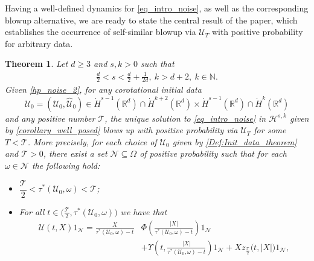 \documentclass[12pt,reqno]{amsart}
\theoremstyle{plain}
\newtheorem{theorem}{Theorem}[section]
\theoremstyle{remark}
\theoremstyle{plain}
\theoremstyle{definition}
\numberwithin{equation}{section}
\numberwithin{equation}{section}
\def\N{{\mathbb N}}
\newcommand{\norm}[1]{\left\|#1\right\|}
\newcommand{\HH}{\mathcal{H}}
\newcommand{\eps}{\varepsilon}
\begin{document}
	Having a well-defined dynamics for \eqref{eq_intro_noise}, as well as the corresponding blowup alternative, we are ready to state the central result of the paper, which establishes the occurrence of self-similar blowup via $\mathcal{U}_T$ with positive probability for arbitrary data.
	\begin{theorem}\label{main_thm}
		Let $d\geq 3$ and $s,k>0$ such that 
		\begin{align*}
			\frac{d}{2}<s<\frac{d}{2}+\frac{1}{2d},\ k>d+2,\ k\in \N.
		\end{align*}
		Given \autoref{hp_noise_2}, for any corotational initial data
		\begin{equation}\label{Def:Init_data_theorem}
			\boldsymbol{\mathcal{U}}_0=(\mathcal{U}_0,\hat{\mathcal{U}}_0)\in \dot{H}^{s-1}(\mathbb{R}^d)\cap \dot{H}^{k+2}(\mathbb{R}^d)\times \dot{H}^{s-1}(\mathbb{R}^d)\cap \dot{H}^{k}(\mathbb{R}^d) 
		\end{equation}  
		and any positive number $\mathcal{T}$, the unique solution to \eqref{eq_intro_noise} in $\mathcal{H}^{s,k}$ given by \autoref{corollary_well_posed} blows up with positive probability via $\mathcal{U}_T$ for some $T<\mathcal{T}$. More precisely, for each choice of $\mathcal{U}_0$ given by \eqref{Def:Init_data_theorem} and $\mathcal{T}>0$, there exist a set $\mathcal{N} \subseteq \Omega$ of positive probability 
		such that for each $\omega\in{\mathcal{N}}$ the following hold:
		\begin{itemize}[leftmargin=2em]
			\setlength{\itemsep}{2mm}
			\item[i)] $\dfrac{\mathcal{T}}{2}<\tau^*(\boldsymbol{\mathcal{U}}_0,\omega) < \mathcal{T}$;
			\item[ii)] For all $t \in \big(\frac{\mathcal{T}}{2}, \tau^*(\boldsymbol{\mathcal{U}}_0,\omega)\big)$ we have that
			\begin{align*}
				\mathcal{U}(t,X)1_{\mathcal{N}}=\frac{X}{\tau^*(\boldsymbol{\mathcal{U}}_0,\omega)-t}&\Phi\left(\frac{\lvert X\rvert}{\tau^*(\boldsymbol{\mathcal{U}}_0,\omega)-t}\right)1_{\mathcal{N}}\\
				&+\Upsilon\left(t,\frac{\lvert X\rvert}{\tau^*(\boldsymbol{\mathcal{U}}_0,\omega)-t}\right)1_{\mathcal{N}}+ Xz_{\tfrac{\mathcal{T}}{2}}\big(t,\lvert X\rvert\big) 1_{\mathcal{N}},
			\end{align*}

\end{itemize}
\end{theorem}
\end{document}
